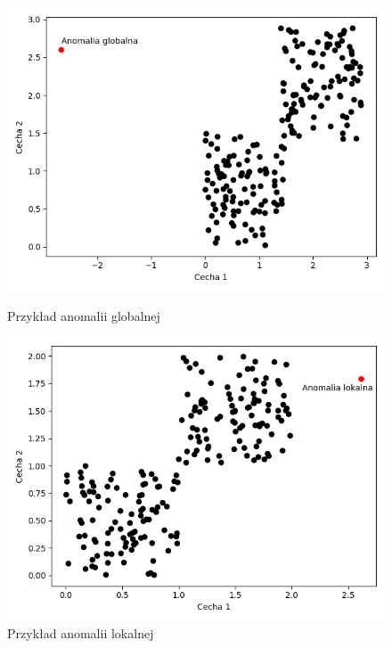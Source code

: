 \begin{figure}[]
  \centering
  \begin{minipage}{0.4\textwidth}
    \includegraphics[width=\textwidth]{chapters/istniejace/images/anomalia_globalna.png}
    \caption{Przykład anomalii globalnej}
    \label{fig:global}
  \end{minipage}
  \hfill
  \begin{minipage}{0.4\textwidth}
    \includegraphics[width=\textwidth]{chapters/istniejace/images/anomalia_lokalna.png}
    \caption{Przykład anomalii lokalnej }
    \label{fig:local}
  \end{minipage}
\end{figure}

